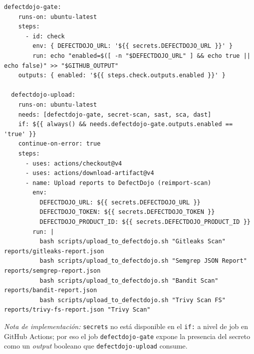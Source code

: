 \documentclass[11pt,a4paper]{article}
\begin{document}
\begin{lstlisting}[style=yaml]
  defectdojo-gate:
    runs-on: ubuntu-latest
    steps:
      - id: check
        env: { DEFECTDOJO_URL: '${{ secrets.DEFECTDOJO_URL }}' }
        run: echo "enabled=$([ -n "$DEFECTDOJO_URL" ] && echo true || echo false)" >> "$GITHUB_OUTPUT"
    outputs: { enabled: '${{ steps.check.outputs.enabled }}' }

  defectdojo-upload:
    runs-on: ubuntu-latest
    needs: [defectdojo-gate, secret-scan, sast, sca, dast]
    if: ${{ always() && needs.defectdojo-gate.outputs.enabled == 'true' }}
    continue-on-error: true
    steps:
      - uses: actions/checkout@v4
      - uses: actions/download-artifact@v4
      - name: Upload reports to DefectDojo (reimport-scan)
        env:
          DEFECTDOJO_URL: ${{ secrets.DEFECTDOJO_URL }}
          DEFECTDOJO_TOKEN: ${{ secrets.DEFECTDOJO_TOKEN }}
          DEFECTDOJO_PRODUCT_ID: ${{ secrets.DEFECTDOJO_PRODUCT_ID }}
        run: |
          bash scripts/upload_to_defectdojo.sh "Gitleaks Scan"       reports/gitleaks-report.json
          bash scripts/upload_to_defectdojo.sh "Semgrep JSON Report" reports/semgrep-report.json
          bash scripts/upload_to_defectdojo.sh "Bandit Scan"         reports/bandit-report.json
          bash scripts/upload_to_defectdojo.sh "Trivy Scan FS"       reports/trivy-fs-report.json "Trivy Scan"
\end{lstlisting}

\noindent\emph{Nota de implementación:} \texttt{secrets} no está disponible en el \texttt{if:} a nivel de job
en GitHub Actions; por eso el job \texttt{defectdojo-gate} expone la presencia del secreto como un
\emph{output} booleano que \texttt{defectdojo-upload} consume.

\end{document}
